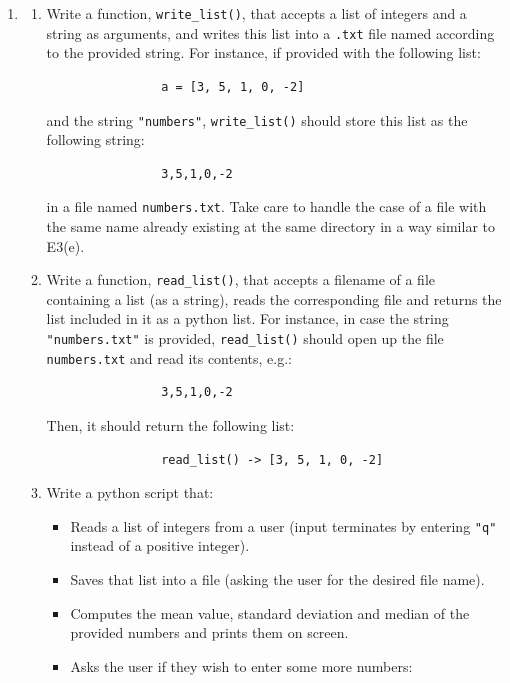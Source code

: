 \documentclass[a4paper, 11pt]{article}
\theoremstyle{definition}
\begin{document}
\begin{enumerate}[label = E\arabic*.]
\begin{enumerate}
			\textit{Hint:} If you have any questions on any statistics terms used above, have a look at a really (really) brief crash--course on descriptive statistics at the end of this file.
		\end{enumerate}
		\item \begin{enumerate}
			\item Write a function, \texttt{write\_list()}, that accepts a list of integers and a string as arguments, and writes this list into a \texttt{.txt} file named according to the provided string. For instance, if provided with the following list:
			\begin{verbatim}
				a = [3, 5, 1, 0, -2]
			\end{verbatim}
			and the string \texttt{"numbers"}, \texttt{write\_list()} should store this list as the following string:
			\begin{verbatim}
				3,5,1,0,-2
			\end{verbatim}
			in a file named \texttt{numbers.txt}. Take care to handle the case of a file with the same name already existing at the same directory in a way similar to E3(e).
			\item Write a function, \texttt{read\_list()}, that accepts a filename of a file containing a list (as a string), reads the corresponding file and returns the list included in it as a python list. For instance, in case the string \texttt{"numbers.txt"} is provided, \texttt{read\_list()} should open up the file \texttt{numbers.txt} and read its contents, e.g.:
			\begin{verbatim}
				3,5,1,0,-2
			\end{verbatim}
			Then, it should return the following list:
			\begin{verbatim}
				read_list() -> [3, 5, 1, 0, -2]
			\end{verbatim}
			\item Write a python script that:
			\begin{itemize}
				\item Reads a list of integers from a user (input terminates by entering \texttt{"q"} instead of a positive integer).
				\item Saves that list into a file (asking the user for the desired file name).
				\item Computes the mean value, standard deviation and median of the provided numbers and prints them on screen.
				\item Asks the user if they wish to enter some more numbers:

\end{itemize}
\end{enumerate}
\end{enumerate}
\end{document}

